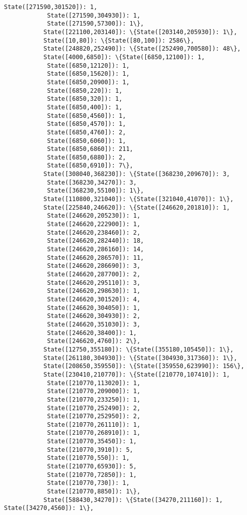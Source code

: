 \documentclass[11pt]{article}
\begin{document}
\begin{Verbatim}[commandchars=\\\{\}]
            State([271590,301520]): 1,
            State([271590,304930]): 1,
            State([271590,57300]): 1\},
           State([221100,203140]): \{State([203140,205930]): 1\},
           State([10,80]): \{State([80,100]): 2586\},
           State([248820,252490]): \{State([252490,700580]): 48\},
           State([4000,6850]): \{State([6850,12100]): 1,
            State([6850,12120]): 1,
            State([6850,15620]): 1,
            State([6850,20900]): 1,
            State([6850,220]): 1,
            State([6850,320]): 1,
            State([6850,400]): 1,
            State([6850,4560]): 1,
            State([6850,4570]): 1,
            State([6850,4760]): 2,
            State([6850,6060]): 1,
            State([6850,6860]): 211,
            State([6850,6880]): 2,
            State([6850,6910]): 7\},
           State([308040,368230]): \{State([368230,209670]): 3,
            State([368230,34270]): 3,
            State([368230,55100]): 1\},
           State([110800,321040]): \{State([321040,41070]): 1\},
           State([225840,246620]): \{State([246620,201810]): 1,
            State([246620,205230]): 1,
            State([246620,222900]): 1,
            State([246620,238460]): 2,
            State([246620,282440]): 18,
            State([246620,286160]): 14,
            State([246620,286570]): 11,
            State([246620,286690]): 3,
            State([246620,287700]): 2,
            State([246620,295110]): 3,
            State([246620,298630]): 1,
            State([246620,301520]): 4,
            State([246620,304050]): 1,
            State([246620,304930]): 2,
            State([246620,351030]): 3,
            State([246620,38400]): 1,
            State([246620,4760]): 2\},
           State([12750,355180]): \{State([355180,105450]): 1\},
           State([261180,304930]): \{State([304930,317360]): 1\},
           State([208650,359550]): \{State([359550,623990]): 156\},
           State([230410,210770]): \{State([210770,107410]): 1,
            State([210770,113020]): 1,
            State([210770,209000]): 1,
            State([210770,233250]): 1,
            State([210770,252490]): 2,
            State([210770,252950]): 2,
            State([210770,261110]): 1,
            State([210770,268910]): 1,
            State([210770,35450]): 1,
            State([210770,3910]): 5,
            State([210770,550]): 1,
            State([210770,65930]): 5,
            State([210770,72850]): 1,
            State([210770,730]): 1,
            State([210770,8850]): 1\},
           State([588430,34270]): \{State([34270,211160]): 1, State([34270,4560]): 1\},

\end{Verbatim}
\end{document}
